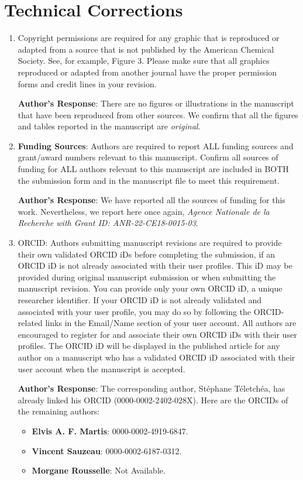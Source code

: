 \documentclass[11pt, a4paper]{article}
\begin{document}
\section{Technical Corrections}
\begin{enumerate}

    \item Copyright permissions are required for any graphic that is reproduced or adapted from a source that is not published by the American Chemical Society. See, for example, Figure 3. Please make sure that all graphics reproduced or adapted from another journal have the proper permission forms and credit lines in your revision.
    
    \textbf{Author's Response}: There are no figures or illustrations in the manuscript that have been reproduced from other sources. We confirm that all the figures and tables reported in the manuscript are \emph{original}.

    
    \item \textbf{Funding Sources}: Authors are required to report ALL funding sources and grant/award numbers relevant to this manuscript. Confirm all sources of funding for ALL authors relevant to this manuscript are included in BOTH the submission form and in the manuscript file to meet this requirement.
 
    \textbf{Author's Response}: We have reported all the sources of funding for this work. Nevertheless, we report here once again, \emph{Agence Nationale de la Recherche with Grant ID: ANR-22-CE18-0015-03}. 

    \item ORCID: Authors submitting manuscript revisions are required to provide their own validated ORCID iDs before completing the submission, if an ORCID iD is not already associated with their user profiles. This iD may be provided during original manuscript submission or when submitting the manuscript revision. You can provide only your own ORCID iD, a unique researcher identifier. If your ORCID iD is not already validated and associated with your user profile, you may do so by following the ORCID-related links in the Email/Name section of your user account. All authors are encouraged to register for and associate their own ORCID iDs with their user profiles. The ORCID iD will be displayed in the published article for any author on a manuscript who has a validated ORCID iD associated with their user account when the manuscript is accepted. 
    
     
    \textbf{Author's Response}: The corresponding author, Stéphane Téletchéa, has already linked his ORCID (0000-0002-2402-028X). Here are the ORCIDs of the remaining authors:
    \begin{itemize}
    \item \textbf{Elvis A. F. Martis}: 0000-0002-4919-6847. 
    \item \textbf{Vincent Sauzeau}: 0000-0002-6187-0312.
    \item \textbf{Morgane Rousselle}: Not Available.
    \end{itemize}

\end{enumerate}
\end{document}
